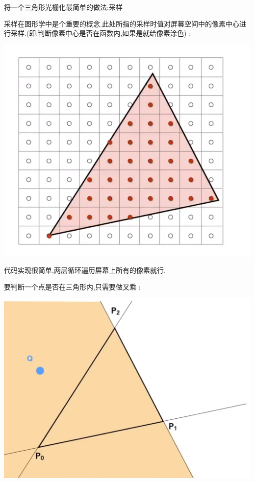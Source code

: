 {{{      将一个三角形光栅化最简单的做法:采样

      采样在图形学中是个重要的概念.此处所指的采样时值对屏幕空间中的像素中心进行采样.(即:判断像素中心是否在函数内,如果是就给像素涂色) :

      \begin{center}
        \includegraphics[scale=0.5]{resources/sample_if_each_pixel_inside_triangle.png}
      \end{center}

      代码实现很简单,两层循环遍历屏幕上所有的像素就行.

      要判断一个点是否在三角形内,只需要做叉乘 :

      \begin{center}
        \includegraphics[scale=0.5]{resources/Triangle_Side_Cross_Prodyct.png}
      \end{center}

}}}
